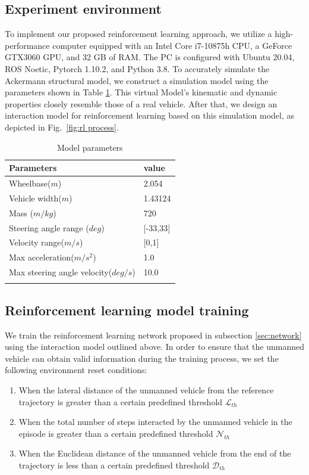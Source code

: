 \documentclass[sn-mathphys]{sn-jnl}%
\theoremstyle{thmstyleone}%
\theoremstyle{thmstyletwo}%
\theoremstyle{thmstylethree}%
\begin{document}
\subsection{Experiment environment}
To implement our proposed reinforcement learning approach, we utilize a high-performance computer equipped with an Intel Core i7-10875h CPU, a GeForce GTX3060 GPU, and 32 GB of RAM. The PC is configured with Ubuntu 20.04, ROS Noetic, Pytorch 1.10.2, and Python 3.8. To accurately simulate the Ackermann structural model, we construct a simulation model using the parameters shown in Table \ref{Model}. This virtual Model's kinematic and dynamic properties closely resemble those of a real vehicle. After that, we design an interaction model for reinforcement learning based on this simulation model, as depicted in Fig.~\ref{fig:rl process}.
\begin{table}[h]
	\begin{center}
		\begin{minipage}{174pt}
			\caption{Model parameters}\label{Model}%
			\begin{tabular}{@{}ll@{}}
				\toprule
				Parameters & value   \\
				\midrule
				Wheelbase($ m $)    & 2.054       \\
				Vehicle width($ m $) & 1.43124     \\
				
				Mass ($ m/kg $)   & 720      \\
				Steering angle range ($ deg $)   & [-33,33]      \\
				Velocity range($ m/s $)  & [0,1]       \\
				Max acceleration($ m/s^2 $)   & 1.0  \\
				Max steering angle velocity($ deg/s $) & 10.0   \\
				\botrule
			\end{tabular}
		\end{minipage}
	\end{center}
\end{table}
\subsection{Reinforcement learning model training}
We train the reinforcement learning network proposed in subsection  \ref{sec:network} using the interaction model outlined above. In order to ensure that the unmanned vehicle can obtain valid information during the training process, we set the following environment reset conditions:
\begin{enumerate}
	\item When the lateral distance of the unmanned vehicle from the reference trajectory is greater than a certain predefined threshold $\mathcal{L}_{th}$
\item When the total number of steps interacted by the unmanned vehicle in the episode is greater than a certain predefined threshold $\mathcal{N}_{th}$
	\item When the Euclidean distance of the unmanned vehicle from the end of the trajectory is less than a certain predefined threshold $\mathcal{D}_{th}$
\end{enumerate}
\end{document}
